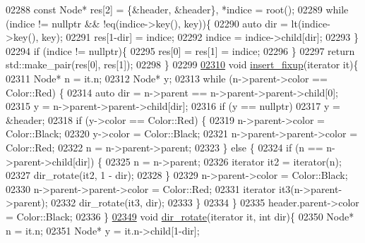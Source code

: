 \begin{DoxyCode}
02288         \textcolor{keyword}{const} Node* res[2] = \{&header, &header\}, *indice = root();
02289         \textcolor{keywordflow}{while} (indice != \textcolor{keyword}{nullptr} && !eq(indice->key(), key))\{
02290             \textcolor{keyword}{auto} dir = lt(indice->key(), key);
02291             res[1-dir] = indice;
02292             indice = indice->child[dir];
02293         \}
02294         \textcolor{keywordflow}{if} (indice != \textcolor{keyword}{nullptr})\{
02295             res[0] = res[1] = indice;
02296         \}
02297         \textcolor{keywordflow}{return} std::make\_pair(res[0], res[1]);
02298     \}
02299 
\hyperlink{classaed2_1_1map_ac9197851fe5b217d45d58bbaf3612c75_ac9197851fe5b217d45d58bbaf3612c75}{02310}     \textcolor{keywordtype}{void} \hyperlink{classaed2_1_1map_ac9197851fe5b217d45d58bbaf3612c75_ac9197851fe5b217d45d58bbaf3612c75}{insert\_fixup}(iterator it)\{
02311         Node* n = it.n;
02312         Node* y;
02313         \textcolor{keywordflow}{while} (n->parent->color == Color::Red) \{
02314             \textcolor{keyword}{auto} dir = n->parent == n->parent->parent->child[0];
02315             y = n->parent->parent->child[dir];
02316             \textcolor{keywordflow}{if} (y == \textcolor{keyword}{nullptr})
02317                 y = &header;
02318             \textcolor{keywordflow}{if} (y->color == Color::Red) \{
02319                 n->parent->color = Color::Black;
02320                 y->color = Color::Black;
02321                 n->parent->parent->color = Color::Red;
02322                 n = n->parent->parent;
02323             \} \textcolor{keywordflow}{else} \{
02324                 \textcolor{keywordflow}{if} (n == n->parent->child[dir])  \{
02325                     n = n->parent;
02326                     iterator it2 = iterator(n);
02327                     dir\_rotate(it2, 1 - dir);
02328                 \}
02329                 n->parent->color = Color::Black;
02330                 n->parent->parent->color = Color::Red;
02331                 iterator it3(n->parent->parent);
02332                 dir\_rotate(it3, dir);
02333             \}
02334         \}
02335         header.parent->color = Color::Black;
02336     \}
\hyperlink{classaed2_1_1map_a94f2862ada0c9ed4f4457eac42ea8f23_a94f2862ada0c9ed4f4457eac42ea8f23}{02349}     \textcolor{keywordtype}{void} \hyperlink{classaed2_1_1map_a94f2862ada0c9ed4f4457eac42ea8f23_a94f2862ada0c9ed4f4457eac42ea8f23}{dir\_rotate}(iterator it, \textcolor{keywordtype}{int} dir)\{
02350         Node* n = it.n;
02351         Node* y = it.n->child[1-dir];

\end{DoxyCode}
